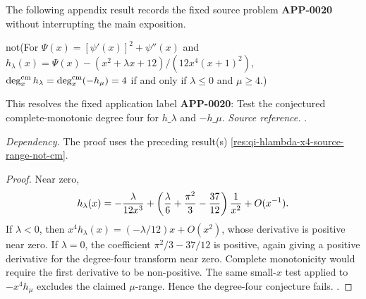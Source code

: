The following appendix result records the fixed source problem \textbf{APP-0020} \cite{qi-hlambda} without interrupting the main exposition.
\begin{counterexample}
\label{res:not-qi-hlambda-degree4-conjecture}
not(For \(\Psi(x)=[\psi'(x)]^2+\psi''(x)\) and \(h_\lambda(x)=\Psi(x)-(x^2+\lambda x+12)/(12x^4(x+1)^2)\), \(\deg_x^{\rm cm}h_\lambda=\deg_x^{\rm cm}(-h_\mu)=4\) if and only if \(\lambda\le0\) and \(\mu\ge4\).)

This resolves the fixed application label \textbf{APP-0020}: Test the conjectured complete-monotonic degree four for \(h\_\lambda\) and \(-h\_\mu\).
\emph{Source reference.} \cite{qi-hlambda}.

\emph{Dependency.} The proof uses the preceding result(s) \ref{res:qi-hlambda-x4-source-range-not-cm}.
\end{counterexample}
\begin{proof}
Near zero,
\[
 h_\lambda(x)=-{\lambda\over 12x^3}
 +\left({\lambda\over6}+{\pi^2\over3}-{37\over12}\right){1\over x^2}
 +O(x^{-1}).
\]
If \(\lambda<0\), then \(x^4h_\lambda(x)=(-\lambda/12)x+O(x^2)\), whose
derivative is positive near zero.  If \(\lambda=0\), the coefficient
\(\pi^2/3-37/12\) is positive, again giving a positive derivative for the
degree-four transform near zero.  Complete monotonicity would require the first
derivative to be non-positive.  The same small-\(x\) test applied to
\(-x^4h_\mu\) excludes the claimed \(\mu\)-range.  Hence the degree-four
conjecture fails. \cite{qi-hlambda}.
\end{proof}

